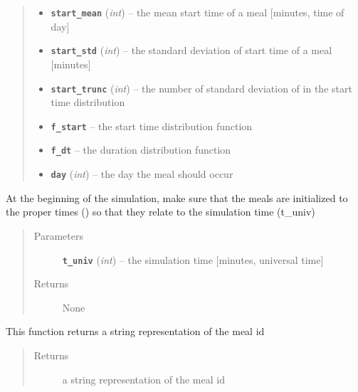 \documentclass[letterpaper,10pt,english]{sphinxmanual}
\begin{document}
\begin{fulllineitems}
\begin{quote}
\begin{description}
\begin{itemize}
\item {} 
\textbf{\texttt{start\_mean}} (\emph{int}) -- the mean start time of a meal {[}minutes, time of day{]}

\item {} 
\textbf{\texttt{start\_std}} (\emph{int}) -- the standard deviation of start time of a meal {[}minutes{]}

\item {} 
\textbf{\texttt{start\_trunc}} (\emph{int}) -- the number of standard deviation of in the start time distribution

\item {} 
\textbf{\texttt{f\_start}} -- the start time distribution function

\item {} 
\textbf{\texttt{f\_dt}} -- the duration distribution function

\item {} 
\textbf{\texttt{day}} (\emph{int}) -- the day the meal should occur

\end{itemize}

\end{description}\end{quote}

\begin{fulllineitems}
\label{meal:meal.Meal.initialize}
At the beginning of the simulation, make sure that the meals are initialized to the proper times         () so that they relate to the simulation time (t\_univ)
\begin{quote}\begin{description}
\item[{Parameters}] \leavevmode
\textbf{\texttt{t\_univ}} (\emph{int}) -- the simulation time {[}minutes, universal time{]}

\item[{Returns}] \leavevmode
None

\end{description}\end{quote}

\end{fulllineitems}


\begin{fulllineitems}
\label{meal:meal.Meal.print_id}
This function returns a string representation of the meal id
\begin{quote}\begin{description}
\item[{Returns}] \leavevmode
a string representation of the meal id


\end{description}
\end{quote}
\end{fulllineitems}
\end{fulllineitems}
\end{document}
